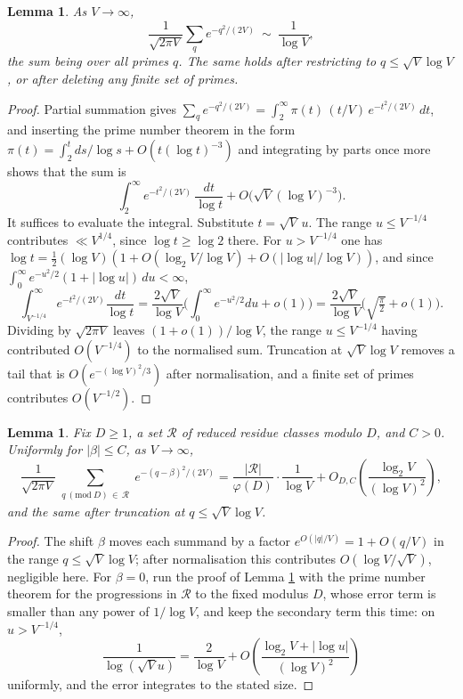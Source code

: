 \documentclass[11pt,reqno]{amsart}
\theoremstyle{plain}
\newtheorem{lemma}[theorem]{Lemma}
\theoremstyle{definition}
\begin{document}
\begin{lemma}\label{lem:halfgauss}
As $V\to\infty$,
\[
\frac1{\sqrt{2\pi V}}\sum_{q}e^{-q^{2}/(2V)}\ \sim\ \frac1{\log V},
\]
the sum being over all primes $q$. The same holds after restricting to $q\le\sqrt V\log V$, or after deleting any finite set of primes.
\end{lemma}

\begin{proof}
Partial summation gives $\sum_qe^{-q^{2}/(2V)}=\int_2^\infty\pi(t)\,(t/V)\,e^{-t^{2}/(2V)}\,dt$, and inserting the prime number theorem in the form $\pi(t)=\int_2^tds/\log s+O(t(\log t)^{-3})$ and integrating by parts once more shows that the sum is
\[
\int_2^\infty e^{-t^{2}/(2V)}\,\frac{dt}{\log t}+O\big(\sqrt V(\log V)^{-3}\big).
\]
It suffices to evaluate the integral. Substitute $t=\sqrt V\,u$. The range $u\le V^{-1/4}$ contributes $\ll V^{1/4}$, since $\log t\ge\log2$ there. For $u>V^{-1/4}$ one has $\log t=\tfrac12(\log V)(1+O(\log_2V/\log V)+O(|\log u|/\log V))$, and since $\int_0^\infty e^{-u^{2}/2}(1+|\log u|)\,du<\infty$,
\[
\int_{V^{-1/4}}^{\infty}e^{-t^{2}/(2V)}\frac{dt}{\log t}
=\frac{2\sqrt V}{\log V}\Big(\int_0^\infty e^{-u^{2}/2}du+o(1)\Big)
=\frac{2\sqrt V}{\log V}\Big(\sqrt{\tfrac\pi2}+o(1)\Big).
\]
Dividing by $\sqrt{2\pi V}$ leaves $(1+o(1))/\log V$, the range $u\le V^{-1/4}$ having contributed $O(V^{-1/4})$ to the normalised sum. Truncation at $\sqrt V\log V$ removes a tail that is $O(e^{-(\log V)^{2}/3})$ after normalisation, and a finite set of primes contributes $O(V^{-1/2})$.
\end{proof}

\begin{lemma}\label{lem:halfgauss-ap}
Fix $D\ge1$, a set $\mathcal R$ of reduced residue classes modulo $D$, and $C>0$. Uniformly for $|\beta|\le C$, as $V\to\infty$,
\[
\frac1{\sqrt{2\pi V}}\sum_{\substack{q\ (\mathrm{mod}\ D)\,\in\,\mathcal R}}e^{-(q-\beta)^{2}/(2V)}
=\frac{|\mathcal R|}{\varphi(D)}\cdot\frac1{\log V}
+O_{D,C}\!\left(\frac{\log_2V}{(\log V)^{2}}\right),
\]
and the same after truncation at $q\le\sqrt V\log V$.
\end{lemma}

\begin{proof}
The shift $\beta$ moves each summand by a factor $e^{O(|q|/V)}=1+O(q/V)$ in the range $q\le\sqrt V\log V$; after normalisation this contributes $O(\log V/\sqrt V)$, negligible here. For $\beta=0$, run the proof of Lemma \ref{lem:halfgauss} with the prime number theorem for the progressions in $\mathcal R$ to the fixed modulus $D$, whose error term is smaller than any power of $1/\log V$, and keep the secondary term this time: on $u>V^{-1/4}$,
\[
\frac1{\log(\sqrt Vu)}=\frac2{\log V}+O\!\left(\frac{\log_2V+|\log u|}{(\log V)^{2}}\right)
\]
uniformly, and the error integrates to the stated size.
\end{proof}
\end{document}
